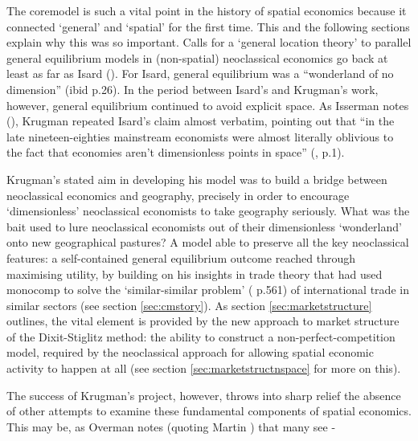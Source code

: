 The \gls{coremodel} is such a vital point in the history of spatial economics because it connected `general' and `spatial' for the first time. This and the following sections explain why this was so important. Calls for a `general location theory' to parallel general equilibrium models in (non-spatial) neoclassical economics go back at least as far as Isard (\citealt{isard_location_1956}). For Isard, general equilibrium was a ``wonderland of no dimension'' (ibid p.26). In the period between Isard's and Krugman's work, however, general equilibrium continued to avoid explicit space. As Isserman notes (\citealt{isserman_its_1996}), Krugman repeated Isard's claim almost verbatim, pointing out that ``in the late nineteen-eighties mainstream economists were almost literally oblivious to the fact that economies aren't dimensionless points in space'' (\citealt{krugman_new_2010}, p.1).  

Krugman's stated aim in developing his model was to build a bridge between neoclassical economics and geography, precisely in order to encourage `dimensionless' neoclassical economists to take geography seriously. What was the bait used to lure neoclassical economists out of their dimensionless `wonderland' onto new geographical pastures? A model able to preserve all the key neoclassical features: a self-contained general equilibrium outcome reached through maximising utility, by building on his insights in trade theory that had used \gls{monocomp} to solve the `similar-similar problem' (\citealt{krugman_increasing_2009-1} p.561) of international trade in similar sectors (see section \ref{sec:cmstory}). As section \ref{sec:marketstructure} outlines, the vital element is provided by the new approach to market structure of the Dixit-Stiglitz method: the ability to construct a non-perfect-competition model, required by the neoclassical approach for allowing spatial economic activity to happen at all (see section \ref{sec:marketstructnspace} for more on this).

The success of Krugman's project, however, throws into sharp relief the absence of other attempts to examine these fundamental components of spatial economics. This may be, as Overman notes (quoting Martin \citeyear{martin_new_1999}) that many see -

